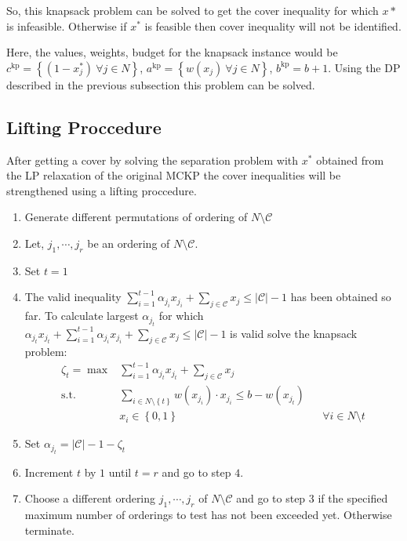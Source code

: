 \documentclass[10pt]{article}
\newcommand{\cbrace}[1]{\left\lbrace #1 \right\rbrace}
\newcommand{\C}{\mathcal{C}}
\begin{document}
    So, this knapsack problem can be solved to get the cover inequality for which $x*$ is infeasible. 
    Otherwise if $x^*$ is feasible then cover inequality will not be identified.

    Here, the values, weights, budget for the knapsack instance would be $c^{\mathrm{kp}} = \cbrace{(1 - x_j^*) ~\forall
    j \in N}$, $a^{\mathrm{kp}} = \cbrace{w(x_j) ~\forall j \in N}$, $b^{\mathrm{kp}} = b + 1$. Using the DP described
    in the previous subsection this problem can be solved.


    \subsection{Lifting Proccedure}
    After getting a cover by solving the separation problem with $x^*$ obtained from the LP relaxation of the 
    original MCKP the cover inequalities will be strengthened using a lifting proccedure.

    \begin{enumerate}
        \item Generate different permutations of ordering of $N \setminus \C$
        \item Let, $j_1, \cdots, j_r$ be an ordering of $N \setminus \C$.
        \item Set $t = 1$
        \item The valid inequality $\sum_{i=1}^{t-1} \alpha_{j_i} x_{j_i} + \sum_{j \in \C} x_j \leq |\C| - 1$ 
        has been obtained so far. To calculate largest $\alpha_{j_t}$ for which $\alpha_{j_t} x_{j_t} + \sum_{i=1}^{t-1} \alpha_{j_i} x_{j_i} 
        + \sum_{j \in \C} x_j \leq |\C| - 1$ is valid solve the knapsack problem:
        \begin{align}
            \zeta_t = \max & \sum_{i=1}^{t-1} \alpha_{j_t} x_{j_t} + \sum_{j \in \C} x_j \\
                    \text{s.t.} & \sum_{i \in N \setminus \cbrace{t}} w(x_{j_i}) \cdot x_{j_i} \leq b - w(x_{j_t}) \\
                                & x_i \in \cbrace{0, 1} && \forall i \in N \setminus {t}
        \end{align}
        \item Set $\alpha_{j_t} = |\C| - 1 - \zeta_t$
        \item Increment $t$ by $1$ until $t = r$ and go to step $4$.
        \item Choose a different ordering $j_1, \cdots, j_r$ of $N \setminus \C$ and go to step 3 if the specified maximum number of orderings 
        to test has not been exceeded yet. Otherwise terminate.
    \end{enumerate}
\end{document}
